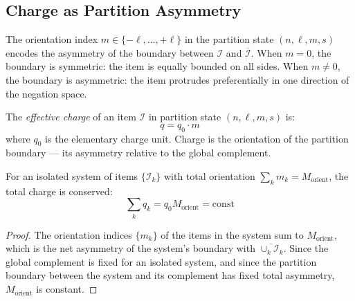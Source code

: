 \subsection{Charge as Partition Asymmetry}
\label{subsec:charge}

The orientation index $m \in \{-\ell, \ldots, +\ell\}$ in the partition state
$(n,\ell,m,s)$ encodes the asymmetry of the boundary between $\mathcal{I}$ and
$\overline{\mathcal{I}}$. When $m = 0$, the boundary is symmetric: the item is
equally bounded on all sides. When $m \neq 0$, the boundary is asymmetric: the
item protrudes preferentially in one direction of the negation space.

\begin{definition}
\label{def:charge}
The \emph{effective charge} of an item $\mathcal{I}$ in partition state
$(n,\ell,m,s)$ is:
\begin{equation}
    q = q_0 \cdot m
    \label{eq:charge_def}
\end{equation}
where $q_0$ is the elementary charge unit. Charge is the orientation of the
partition boundary --- its asymmetry relative to the global complement.
\end{definition}

\begin{theorem}
\label{thm:charge_conserve}
For an isolated system of items $\{\mathcal{I}_k\}$ with total orientation
$\sum_k m_k = M_{\mathrm{orient}}$, the total charge is conserved:
\begin{equation}
    \sum_k q_k = q_0 M_{\mathrm{orient}} = \mathrm{const}
    \label{eq:charge_conserve}
\end{equation}
\end{theorem}

\begin{proof}
The orientation indices $\{m_k\}$ of the items in the system sum to
$M_{\mathrm{orient}}$, which is the net asymmetry of the system's boundary
with $\overline{\cup_k \mathcal{I}_k}$. Since the global complement is fixed
for an isolated system, and since the partition boundary between the system and
its complement has fixed total asymmetry, $M_{\mathrm{orient}}$ is constant.
\end{proof}

